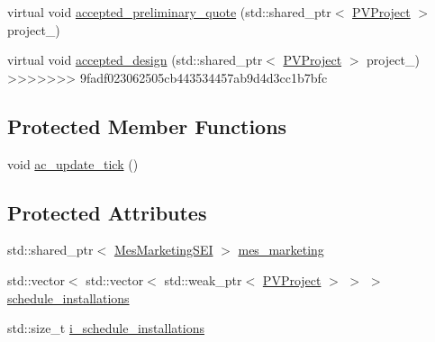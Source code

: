 {\bf }\par
\begin{DoxyCompactItemize}
\item 
virtual void \hyperlink{classsolar__core_1_1_s_e_i_ad683e480828c042d311a18cefbf2e95d}{accepted\+\_\+preliminary\+\_\+quote} (std\+::shared\+\_\+ptr$<$ \hyperlink{classsolar__core_1_1_p_v_project}{P\+V\+Project} $>$ project\+\_\+)
\end{DoxyCompactItemize}

{\bf }\par
\begin{DoxyCompactItemize}
\item 
virtual void \hyperlink{classsolar__core_1_1_s_e_i_a007004337169bac4c67b66e37ca89767}{accepted\+\_\+design} (std\+::shared\+\_\+ptr$<$ \hyperlink{classsolar__core_1_1_p_v_project}{P\+V\+Project} $>$ project\+\_\+)
>>>>>>> 9fadf023062505cb443534457ab9d4d3cc1b7bfc
\end{DoxyCompactItemize}

\subsection*{Protected Member Functions}
{\bf }\par
\begin{DoxyCompactItemize}
\item 
void \hyperlink{classsolar__core_1_1_s_e_i_a51873235b9ab1795b5616e672c75e499}{ac\+\_\+update\+\_\+tick} ()
\end{DoxyCompactItemize}

\subsection*{Protected Attributes}
{\bf }\par
\begin{DoxyCompactItemize}
\item 
std\+::shared\+\_\+ptr$<$ \hyperlink{classsolar__core_1_1_mes_marketing_s_e_i}{Mes\+Marketing\+S\+E\+I} $>$ \hyperlink{classsolar__core_1_1_s_e_i_ad5326c45ccd4a5512a6c0a296656264d}{mes\+\_\+marketing}
\end{DoxyCompactItemize}

{\bf }\par
\begin{DoxyCompactItemize}
\item 
std\+::vector$<$ std\+::vector$<$ std\+::weak\+\_\+ptr$<$ \hyperlink{classsolar__core_1_1_p_v_project}{P\+V\+Project} $>$ $>$ $>$ \hyperlink{classsolar__core_1_1_s_e_i_aacda4fae2c17d58672b60eba9c8cdc63}{schedule\+\_\+installations}
\item 
std\+::size\+\_\+t \hyperlink{classsolar__core_1_1_s_e_i_ad906dcd5b638e405a7daf14539096377}{i\+\_\+schedule\+\_\+installations}
\end{DoxyCompactItemize}

